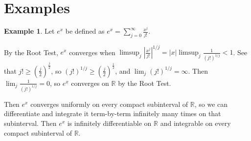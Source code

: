 \documentclass[12pt, letterpaper]{article}
\theoremstyle{definition}
\newtheorem{ex}[thm]{Example}
\begin{document}
\section{Examples}
\begin{ex}
  Let $e^x$ be defined as $e^x = \sum_{j=0}^\infty \frac{x^j}{j!}$.

  By the Root Test, $e^x$ converges when
  $\limsup_j \left|\frac{x^j}{j!}\right|^{1/j} = |x| \limsup_j \frac{1}{(j!)^{1/j}} < 1$.
  See that $j! \ge (\frac{j}{2})^\frac{j}{2}$, so
  $(j!)^{1/j} \ge (\frac{j}{2})^{\frac{1}{2}}$, and $\lim_j (j!)^{1/j} = \infty$.
  Then $\lim_j \frac{1}{(j!)^{1/j}} = 0$, so $e^x$ converges on $\mathbb{R}$ by the
  Root Test.

  Then $e^x$ converges uniformly on every compact subinterval of $\mathbb{R}$,
  so we can differentiate and integrate it term-by-term infinitely many times on that subinterval.
  Then $e^x$ is infinitely differentiable on $\mathbb{R}$ and integrable on every
  compact subinterval of $\mathbb{R}$.
\end{ex}
\end{document}
